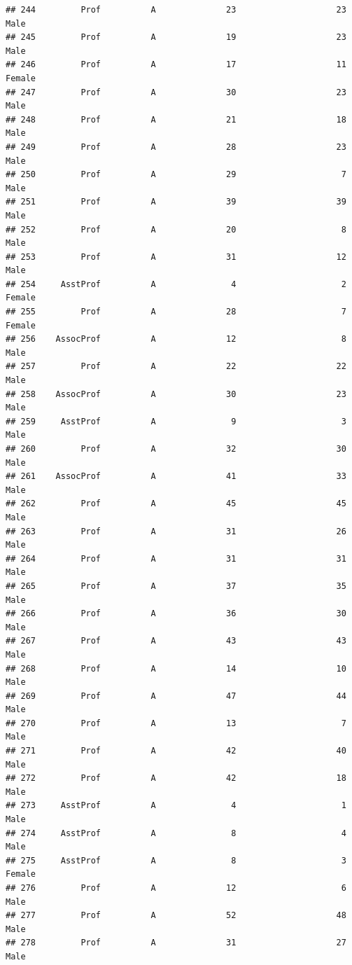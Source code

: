 \documentclass[]{article}
\begin{document}
\begin{verbatim}
## 244         Prof          A              23                    23   Male
## 245         Prof          A              19                    23   Male
## 246         Prof          A              17                    11 Female
## 247         Prof          A              30                    23   Male
## 248         Prof          A              21                    18   Male
## 249         Prof          A              28                    23   Male
## 250         Prof          A              29                     7   Male
## 251         Prof          A              39                    39   Male
## 252         Prof          A              20                     8   Male
## 253         Prof          A              31                    12   Male
## 254     AsstProf          A               4                     2 Female
## 255         Prof          A              28                     7 Female
## 256    AssocProf          A              12                     8   Male
## 257         Prof          A              22                    22   Male
## 258    AssocProf          A              30                    23   Male
## 259     AsstProf          A               9                     3   Male
## 260         Prof          A              32                    30   Male
## 261    AssocProf          A              41                    33   Male
## 262         Prof          A              45                    45   Male
## 263         Prof          A              31                    26   Male
## 264         Prof          A              31                    31   Male
## 265         Prof          A              37                    35   Male
## 266         Prof          A              36                    30   Male
## 267         Prof          A              43                    43   Male
## 268         Prof          A              14                    10   Male
## 269         Prof          A              47                    44   Male
## 270         Prof          A              13                     7   Male
## 271         Prof          A              42                    40   Male
## 272         Prof          A              42                    18   Male
## 273     AsstProf          A               4                     1   Male
## 274     AsstProf          A               8                     4   Male
## 275     AsstProf          A               8                     3 Female
## 276         Prof          A              12                     6   Male
## 277         Prof          A              52                    48   Male
## 278         Prof          A              31                    27   Male

\end{verbatim}
\end{document}
